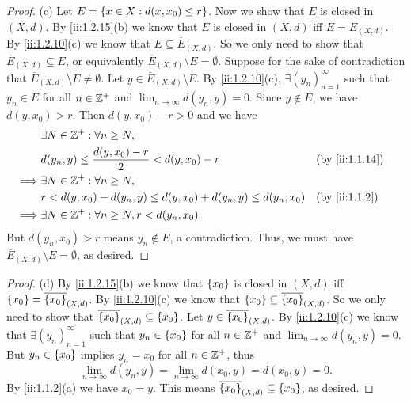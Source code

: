 \begin{proof}{(c)}
  Let \(E = \left\lbrace x \in X : d(x, x_0) \leq r\right\rbrace\).
  Now we show that \(E\) is closed in \((X, d)\).
  By \cref{ii:1.2.15}(b) we know that \(E\) is closed in \((X, d)\) iff \(E = \overline{E}_{(X, d)}\).
  By \cref{ii:1.2.10}(c) we know that \(E \subseteq \overline{E}_{(X, d)}\).
  So we only need to show that \(\overline{E}_{(X, d)} \subseteq E\), or equivalently \(\overline{E}_{(X, d)} \setminus E = \emptyset\).
  Suppose for the sake of contradiction that \(\overline{E}_{(X, d)} \setminus E \neq \emptyset\).
  Let \(y \in \overline{E}_{(X, d)} \setminus E\).
  By \cref{ii:1.2.10}(c), \(\exists (y_n)_{n = 1}^\infty\) such that \(y_n \in E\) for all \(n \in \mathbb{Z}^+\) and \(\lim_{n \to \infty} d(y_n, y) = 0\).
  Since \(y \notin E\), we have \(d(y, x_0) > r\).
  Then \(d(y, x_0) - r > 0\) and we have
  \begin{align*}
             & \exists N \in \Z^+ : \forall n \geq N,                                                    \\
             & d(y_n, y) \leq \dfrac{d(y, x_0) - r}{2} < d(y, x_0) - r               &  & \by{ii:1.1.14} \\
    \implies & \exists N \in \Z^+ : \forall n \geq N,                                                    \\
             & r < d(y, x_0) - d(y_n, y) \leq d(y, x_0) + d(y_n, y) \leq d(y_n, x_0) &  & \by{ii:1.1.2}  \\
    \implies & \exists N \in \Z^+ : \forall n \geq N, r < d(y_n, x_0).
  \end{align*}
  But \(d(y_n, x_0) > r\) means \(y_n \notin E\), a contradiction.
  Thus, we must have \(\overline{E}_{(X, d)} \setminus E = \emptyset\), as desired.
\end{proof}

\begin{proof}{(d)}
  By \cref{ii:1.2.15}(b) we know that \(\left\lbrace x_0\right\rbrace\) is closed in \((X, d)\) iff \(\left\lbrace x_0\right\rbrace = \overline{\left\lbrace x_0\right\rbrace}_{(X, d)}\).
  By \cref{ii:1.2.10}(c) we know that \(\left\lbrace x_0\right\rbrace \subseteq \overline{\left\lbrace x_0\right\rbrace}_{(X, d)}\).
  So we only need to show that \(\overline{\left\lbrace x_0\right\rbrace}_{(X, d)} \subseteq \left\lbrace x_0\right\rbrace\).
  Let \(y \in \overline{\left\lbrace x_0\right\rbrace}_{(X, d)}\).
  By \cref{ii:1.2.10}(c) we know that \(\exists (y_n)_{n = 1}^\infty\) such that \(y_n \in \left\lbrace x_0\right\rbrace\) for all \(n \in \mathbb{Z}^+\) and \(\lim_{n \to \infty} d(y_n, y) = 0\).
  But \(y_n \in \left\lbrace x_0\right\rbrace\) implies \(y_n = x_0\) for all \(n \in \mathbb{Z}^+\), thus
  \[
    \lim_{n \to \infty} d(y_n, y) = \lim_{n \to \infty} d(x_0, y) = d(x_0, y) = 0.
  \]
  By \cref{ii:1.1.2}(a) we have \(x_0 = y\).
  This means \(\overline{\left\lbrace x_0\right\rbrace}_{(X, d)} \subseteq \left\lbrace x_0\right\rbrace\), as desired.
\end{proof}

